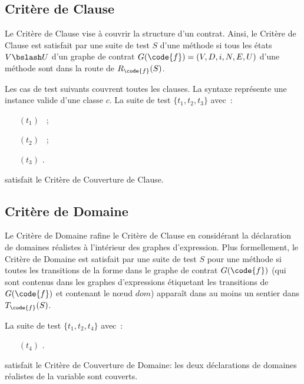 \subsection{Critère de Clause}

Le Critère de Clause vise à couvrir la structure d'un contrat. Ainsi, le Critère
de Clause est satisfait par une suite de test $S$ d'une méthode  si tous
les états $V \bslash U$ d'un graphe de contrat $G(\code{f}) = (V, D, i, N, E,
U)$ d'une méthode  sont dans la route de $R_\code{f}(S)$.

\begin{example}

Les cas de test suivants couvrent toutes les clauses. La syntaxe
 représente une instance valide d'une classe $c$. La suite
de test $\{t_1, t_2, t_3\}$ avec~:
%
\begin{itemize}

\item[$(t_1)$] ~;

\item[$(t_2)$] ~;

\item[$(t_3)$] .

\end{itemize}
%
satisfait le Critère de Couverture de Clause.

\end{example}

\subsection{Critère de Domaine}

Le Critère de Domaine rafine le Critère de Clause en considérant la déclaration
de domaines réalistes à l'intérieur des graphes d'expression. Plus formellement,
le Critère de Domaine est satisfait par une suite de test $S$ pour une méthode
 si toutes les transitions de la forme  dans le graphe de
contrat $G(\code{f})$ (qui sont contenus dans les graphes d'expressions
étiquetant les transitions de $G(\code{f})$ et contenant le nœud $\mathit{dom}$)
apparaît dans au moins un sentier dans $T_\code{f}(S)$.

\begin{example}

La suite de test $\{t_1, t_2, t_4\}$ avec~:
%
\begin{itemize}

\item[$(t_4)$] .

\end{itemize}
%
satisfait le Critère de Couverture de Domaine: les deux déclarations de domaines
réalistes de la variable  sont couverts.

\end{example}

